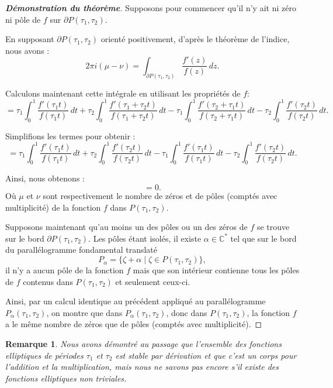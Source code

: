 \documentclass[12pt]{article}
\newtheorem{remark}{Remarque}
\begin{document}
        \begin{proof}[\textbf{Démonstration du théorème}]
        Supposons pour commencer qu'il n'y ait ni zéro ni pôle de \( f \) sur \( \partial P(\tau_1, \tau_2) \).
        
        En supposant \( \partial P(\tau_1, \tau_2) \) orienté positivement, d'après le théorème de l'indice, nous avons :
        \[
        2\pi i(\mu - \nu) = \int_{\partial P(\tau_1, \tau_2)} \frac{f'(z)}{f(z)} \, dz.
        \]
        
        Calculons maintenant cette intégrale en utilisant les propriétés de \( f \):
        \[
        = \tau_1  \int_0^1 \frac{f'(\tau_1 t)}{f(\tau_1 t)} \, dt + \tau_2 \int_0^1 \frac{f'(\tau_1 + \tau_2 t)}{f(\tau_1 + \tau_2 t)} \, dt - \tau_1 \int_0^1 \frac{f'(\tau_2 + \tau_1 t)}{f(\tau_2 + \tau_1 t)} \, dt - \tau_2 \int_0^1 \frac{f'(\tau_2 t)}{f(\tau_2 t)} \, dt.
        \]
        
        Simplifions les termes pour obtenir :
        \[
        = \tau_1 \int_0^1 \frac{f'(\tau_1 t)}{f(\tau_1 t)} \, dt + \tau_2 \int_0^1 \frac{f'( \tau_2 t)}{f( \tau_2 t)} \, dt - \tau_1 \int_0^1 \frac{f'( \tau_1 t)}{f( \tau_1 t)} \, dt - \tau_2 \int_0^1 \frac{f'(\tau_2 t)}{f(\tau_2 t)} \, dt.
        \]
        
        Ainsi, nous obtenons :
        \[
        = 0.
        \]
        Où \( \mu \) et \( \nu \) sont respectivement le nombre de zéros et de pôles (comptés avec multiplicité) de la fonction \( f \) dans \( P(\tau_1, \tau_2) \).
        
        Supposons maintenant qu'au moins un des pôles ou un des zéros de \( f \) se trouve sur le bord \( \partial P(\tau_1, \tau_2) \). Les pôles étant isolés, il existe \( \alpha \in \mathbb{C}^* \) tel que sur le bord du parallélogramme fondamental translaté
        \[
        P_\alpha = \{\zeta + \alpha \mid \zeta \in P(\tau_1, \tau_2)\},
        \]
        il n'y a aucun pôle de la fonction \( f \) mais que son intérieur contienne tous les pôles de \( f \) contenus dans \( P(\tau_1, \tau_2) \) et seulement ceux-ci.
        
        Ainsi, par un calcul identique au précédent appliqué au parallélogramme \( P_\alpha(\tau_1, \tau_2) \), on montre que dans \( P_\alpha(\tau_1, \tau_2) \), donc dans \( P(\tau_1, \tau_2) \), la fonction \( f \) a le même nombre de zéros que de pôles (comptés avec multiplicité).
        \end{proof}
        
        \begin{remark}
        Nous avons démontré au passage que l'ensemble des fonctions elliptiques de périodes \( \tau_1 \) et \( \tau_2 \) est stable par dérivation et que c'est un corps pour l'addition et la multiplication, mais nous ne savons pas encore s'il existe des fonctions elliptiques non triviales.
        \end{remark}
        
\end{document}
